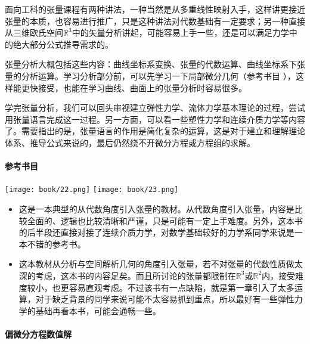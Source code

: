 面向工科的张量课程有两种讲法，一种当然是从多重线性映射入手，这样讲更接近张量的本质，也容易进行推广，只是这种讲法对代数基础有一定要求；另一种直接从三维欧氏空间$\mathbb{R}^3$中的矢量分析讲起，可能容易上手一些，还是可以满足力学中的绝大部分公式推导需求的。

张量分析大概包括这些内容：曲线坐标系变换、张量的代数运算、曲线坐标系下张量的分析运算。学习分析部分前，可以先学习一下局部微分几何（参考书目 \textcite[微分几何]{彭家贵2002微分几何} ），这样能更快接受，也能在学习曲线、曲面上的张量分析时容易很多。

学完张量分析，我们可以回头审视建立弹性力学、流体力学基本理论的过程，尝试用张量语言完成这一过程。另一方面，可以看一些塑性力学和连续介质力学等内容了。需要指出的是，张量语言的作用是简化复杂的运算，这是对于建立和理解理论体系、推导公式来说的，最后仍然绕不开微分方程或方程组的求解。

\paragraph{参考书目}

\begin{center}
    \texttt{[image: book/22.png]} \quad
    \texttt{[image: book/23.png]}
\end{center}

\begin{itemize}
    \item \textcite[现代张量分析及其在连续介质力学中的应用]{谢锡麟2014现代张量分析及其在连续介质力学中的应用}

          这是一本典型的从代数角度引入张量的教材。从代数角度引入张量，内容是比较全面的、逻辑也比较清晰和严谨，只是可能有一定上手难度。另外，这本书的后半段还直接对接了连续介质力学，对数学基础较好的力学系同学来说是一本不错的参考书。
    \item \textcite[张量分析]{黄克智2003张量分析}

          这本教材从分析与空间解析几何的角度引入张量，若不对张量的代数性质做太深的考虑，这本书的内容足矣。而且所讨论的张量都限制在$\mathbb{R}^3$或$\mathbb{R}^2$内，接受难度较小，也更容易直观考虑。不过该书有一点缺陷，就是第一章引入了太多运算，对于缺乏背景的同学来说可能不太容易抓到重点，所以最好有一些弹性力学的基础再看本书，可能会通畅一些。
\end{itemize}




\paragraph{偏微分方程数值解}

